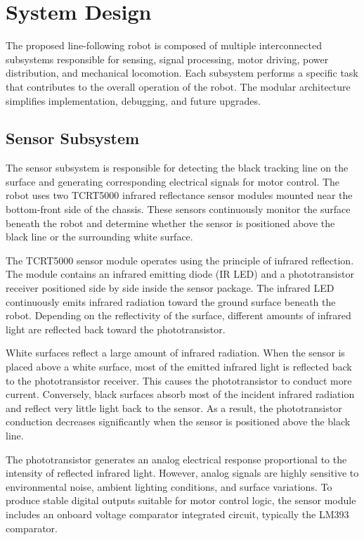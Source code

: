 \documentclass[conference]{IEEEtran}
\begin{document}
\section{System Design}

The proposed line-following robot is composed of multiple interconnected subsystems responsible for sensing, signal processing, motor driving, power distribution, and mechanical locomotion. Each subsystem performs a specific task that contributes to the overall operation of the robot. The modular architecture simplifies implementation, debugging, and future upgrades.


\subsection{Sensor Subsystem}

The sensor subsystem is responsible for detecting the black tracking line on the surface and generating corresponding electrical signals for motor control. The robot uses two TCRT5000 infrared reflectance sensor modules mounted near the bottom-front side of the chassis. These sensors continuously monitor the surface beneath the robot and determine whether the sensor is positioned above the black line or the surrounding white surface.

The TCRT5000 sensor module operates using the principle of infrared reflection. The module contains an infrared emitting diode (IR LED) and a phototransistor receiver positioned side by side inside the sensor package. The infrared LED continuously emits infrared radiation toward the ground surface beneath the robot. Depending on the reflectivity of the surface, different amounts of infrared light are reflected back toward the phototransistor.

White surfaces reflect a large amount of infrared radiation. When the sensor is placed above a white surface, most of the emitted infrared light is reflected back to the phototransistor receiver. This causes the phototransistor to conduct more current. Conversely, black surfaces absorb most of the incident infrared radiation and reflect very little light back to the sensor. As a result, the phototransistor conduction decreases significantly when the sensor is positioned above the black line.

The phototransistor generates an analog electrical response proportional to the intensity of reflected infrared light. However, analog signals are highly sensitive to environmental noise, ambient lighting conditions, and surface variations. To produce stable digital outputs suitable for motor control logic, the sensor module includes an onboard voltage comparator integrated circuit, typically the LM393 comparator.
\end{document}
